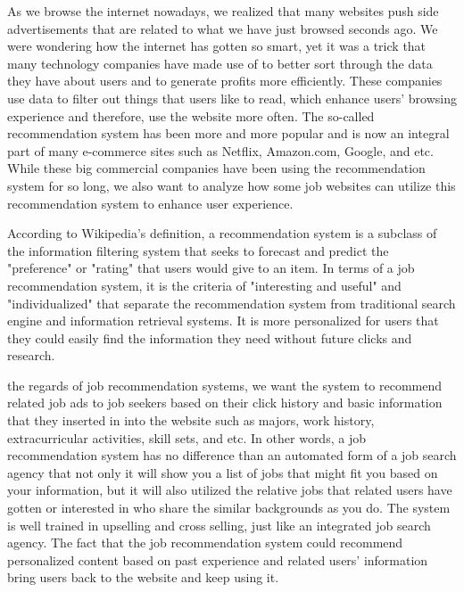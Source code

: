 \documentclass[sigconf]{acmart}
\begin{document}
As we browse the internet nowadays, we realized that many websites push side advertisements that are related to what we have just browsed seconds ago. We were wondering how the internet has gotten so smart, yet it was a trick that many technology companies have made use of to better sort through the data they have about users and to generate profits more efficiently. These companies use data to filter out things that users like to read, which enhance users' browsing experience and therefore, use the website more often. The so-called recommendation system has been more and more popular and is now an integral part of many e-commerce sites such as Netflix, Amazon.com, Google, and etc. While these big commercial companies have been using the recommendation system for so long, we also want to analyze how some job websites can utilize this recommendation system to enhance user experience. 
\par According to Wikipedia's definition, a recommendation system  is a subclass of the information filtering system that seeks to forecast and predict the "preference" or "rating" that users would give to an item. In terms of a job recommendation system, it is the criteria of  "interesting and useful" and "individualized" that separate the recommendation system from traditional search engine and information retrieval systems. It is more personalized for users that they could easily find the information they need without future clicks and research.
\par the regards of job recommendation systems, we want the system to recommend related job ads to job seekers based on their click history and basic information that they inserted in into the website such as majors, work history, extracurricular activities, skill sets, and etc. In other words, a job recommendation system has no difference than an automated form of a job search agency that not only it will show you a list of jobs that might fit you based on your information, but it will also utilized the relative jobs that related users have gotten or interested in who share the similar backgrounds as you do. The system is well trained in upselling and cross selling, just like an integrated job search agency. The fact that the job recommendation system could recommend personalized content based on past experience and related users' information bring users back to the website and keep using it. 
\end{document}
